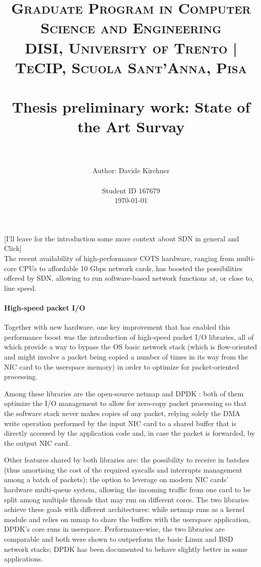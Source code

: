 \documentclass[paper=a4, fontsize=11pt]{scrartcl}
\title{
        \vspace{-1in}
        \usefont{OT1}{bch}{b}{n}
        \normalfont \normalsize \textsc{Graduate Program in Computer Science and Engineering} \\
	\normalfont \normalsize \textsc{DISI, University of Trento | TeCIP, Scuola Sant'Anna, Pisa} \\ [25pt] %
        \horrule{0.5pt} \\[0.4cm]
        \huge Thesis preliminary work: State of the Art Survay\\
        \horrule{2pt} \\[0.5cm]
}
\author{
        \normalfont                                 \normalsize
        Author: Davide Kirchner \\[-3pt]  \normalsize
        \mono{davide.kirchner@yahoo.it}\\[-3pt]     \normalsize
        Student ID 167679\\[-3pt]     \normalsize
        \today
}
\date{}
\begin{document}
\maketitle

\setcounter{tocdepth}{3}

[I'll leave for the introduction some more context about SDN in general and Click\cite{click}]\\

The recent availability of high-performance \gls{COTS} hardware, ranging from multi-core CPUs to affordable 10 Gbps network cards, has boosted the possibilities offered by \gls{SDN}, allowing to run software-based network functions at, or close to, line speed.

\paragraph{High-speed packet I/O} Together with new hardware, one key improvement that has enabled this performance boost was the introduction of high-speed packet I/O libraries, all of which provide a way to bypass the OS basic network stack (which is flow-oriented and might involve a packet being copied a number of times in its way from the NIC card to the userspace memory) in order to optimize for packet-oriented processing.

Among these libraries are the open-source netmap\cite{netmap} and DPDK\cite{dpdk}
: both of them optimize the I/O management to allow for zero-copy packet processing so that the software stack never makes copies of any packet, relying solely the DMA write operation performed by the input NIC card to a shared buffer that is directly accessed by the application code and, in case the packet is forwarded, by the output NIC card.

Other features shared by both libraries are:
the possibility to receive in batches (thus amortising the cost of the required syscalls and interrupts management among a batch of packets);
the option to leverage on modern NIC cards' hardware multi-queue system, allowing the incoming traffic from one card to be split among multiple threads that may run on different cores. The two libraries achieve these goals with different architectures: while netmap runs as a kernel module and relies on mmap to share the buffers with the userspace application, DPDK's core runs in userspace.
Performance-wise, the two libraries are comparable and both were shown to outperform the basic Linux and BSD network stacks; DPDK has been documented to behave slightly better in some applications\cite{fastclick}.
\end{document}
